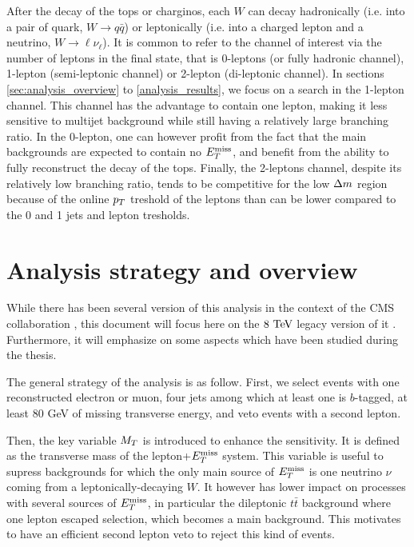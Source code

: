     After the decay of the tops or charginos, each $W$ can decay hadronically (i.e. into
    a pair of quark, $W \rightarrow q\bar{q}$) or leptonically (i.e. into a charged
    lepton and a neutrino, $W \rightarrow \ell \nu_{\ell}$). It is common to refer to
    the channel of interest via the number of leptons in the final state, that is 0-leptons
    (or fully hadronic channel), 1-lepton (semi-leptonic channel) or 2-lepton (di-leptonic
    channel). In sections \ref{sec:analysis_overview} to \ref{analysis_results}, we focus on 
    a search in the 1-lepton channel. This channel has the advantage to contain one
    lepton, making it less sensitive to multijet background while still having a relatively
    large branching ratio. In the 0-lepton, one can however profit from the fact that
    the main backgrounds are expected to contain no $E_T^\text{miss}$, and benefit from the ability
    to fully reconstruct the decay of the tops. Finally, the 2-leptons channel, despite
    its relatively low branching ratio, tends to be competitive for the low $\Delta m$
    region because of the online $p_T$ treshold of the leptons than can be lower compared
    to the 0 and 1 jets and lepton tresholds.

    \section{Analysis strategy and overview \label{sec:analysis_overview}}
   
    While there has been several version of this analysis in the context of the CMS 
    collaboration \cite{SUS-12-023-PAS, SUS-13-011-PUB, SUS-14-015-PAS}, this document 
    will focus here on the $8~\text{TeV}$ legacy version of it \cite{SUS-14-015-PAS}. Furthermore, 
    it will emphasize on some aspects which have been studied during the thesis.

    The general strategy of the analysis is as follow. First, we select events with one 
    reconstructed electron or muon, four jets among which at least one is $b$-tagged, 
    at least 80 GeV of missing transverse energy, and veto events with a second lepton. 

    Then, the key variable $M_T$ is introduced to enhance the sensitivity. It is defined as 
    the transverse mass of the lepton+$E_T^\text{miss}$ system. This variable is useful to supress
    backgrounds for which the only main source of $E_T^\text{miss}$ is one neutrino $\nu$ 
    coming from a leptonically-decaying $W$. It however has lower impact on processes with 
    several sources of $E_T^\text{miss}$, in particular the dileptonic $t\bar{t}$ background where one 
    lepton escaped selection, which becomes a main background. This motivates to have an 
    efficient second lepton veto to reject this kind of events.


